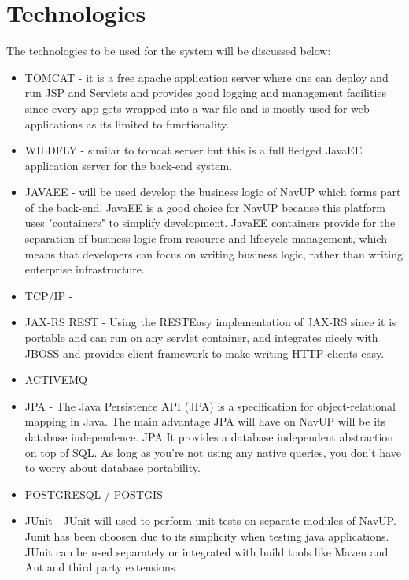 
\section{Technologies}
The technologies to be used for the system will be discussed below:
\begin{itemize}
	\item TOMCAT - it is a free apache application server where one can deploy and run JSP and Servlets and provides good logging and management facilities since every app gets wrapped into a war file and is mostly used for web applications as its limited to functionality.
	
	\item WILDFLY - similar to tomcat server but this is a full fledged JavaEE application server for the back-end system.
	
	\item JAVAEE - will be used develop the business logic of NavUP which forms part of the back-end. JavaEE is a good choice for NavUP because this platform uses "containers" to simplify development. JavaEE containers provide for the separation of business logic from resource and lifecycle management, which means that developers can focus on writing business logic, rather than writing enterprise infrastructure. 
	
	\item TCP/IP - 
	
	\item JAX-RS REST - Using the RESTEasy implementation of JAX-RS since it is portable and can run on any servlet container, and integrates nicely with JBOSS and provides client framework to make writing HTTP clients easy.
	
	\item ACTIVEMQ - 
	
	\item JPA - The Java Persistence API (JPA) is a specification for object-relational mapping in Java. The main advantage JPA will have on NavUP will be its database independence. JPA It provides a database independent abstraction on top of SQL. As long as you're not using any native queries, you don't have to worry about database portability. 
	
	\item POSTGRESQL / POSTGIS - 
	
	\item JUnit - JUnit will used to perform unit tests on separate modules of NavUP. Junit has been choosen due to its simplicity when testing java applications. JUnit can be used separately or integrated with build tools like Maven and Ant and third party extensions
	

\end{itemize}
